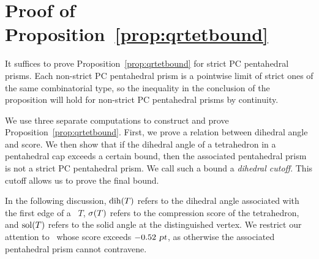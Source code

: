 \section{Proof of Proposition~\ref{prop:qrtetbound}}


    It suffices to prove
 Proposition~\ref{prop:qrtetbound} for strict PC pentahedral prisms. Each
 non-strict PC pentahedral prism is a pointwise limit of strict
 ones of the same combinatorial type, so the inequality in
 the conclusion of the proposition will hold for non-strict
 PC pentahedral prisms by continuity.

We use three separate computations to construct and prove Proposition~\ref{prop:qrtetbound}.
First, we prove a relation between dihedral
angle and score.  We then show that if the dihedral angle of a
tetrahedron in a pentahedral cap exceeds a certain bound,
then the associated pentahedral prism is not a strict PC pentahedral prism.
We call such a bound a
{\em dihedral cutoff}.  This cutoff allows us to prove the final bound.


In the following discussion, $\operatorname{dih}(T)$ refers to the dihedral angle
associated with the first edge of a \qrtet\ $T$, $\operatorname{\sigma}(T)$ refers to
the compression score of the tetrahedron,
and $\operatorname{sol}(T)$ refers to the solid
angle at the distinguished vertex.  We restrict
our attention to \qrtets\ whose score exceeds $-0.52 \text{ \sl pt}$, as
otherwise the associated pentahedral prism cannot contravene.

